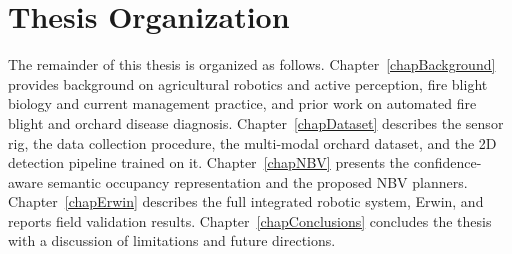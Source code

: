 \section{Thesis Organization} \label{secOutline}

The remainder of this thesis is organized as follows.
Chapter~\ref{chapBackground} provides background on agricultural robotics and
active perception, fire blight biology and current management practice, and
prior work on automated fire blight and orchard disease diagnosis.
Chapter~\ref{chapDataset} describes the sensor rig, the data collection
procedure, the multi-modal orchard dataset, and the 2D detection pipeline
trained on it.
Chapter~\ref{chapNBV} presents the confidence-aware semantic occupancy
representation and the proposed NBV planners.
Chapter~\ref{chapErwin} describes the full integrated robotic system, Erwin,
and reports field validation results.
Chapter~\ref{chapConclusions} concludes the thesis with a discussion of
limitations and future directions.
